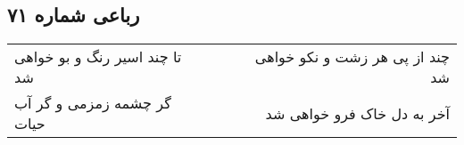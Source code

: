 \begin{center}
\section*{رباعی شماره ۷۱}
\label{sec:sh071}
\begin{longtable}{l p{0.5cm} r}
تا چند اسیر رنگ و بو خواهی شد
&&
چند از پی هر زشت و نکو خواهی شد
\\
گر چشمه زمزمی و گر آب حیات
&&
آخر به دل خاک فرو خواهی شد
\\
\end{longtable}
\end{center}
